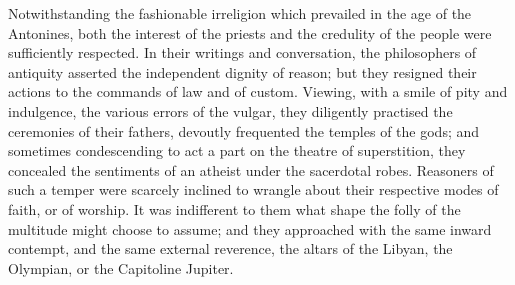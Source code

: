 
Notwithstanding the fashionable irreligion which prevailed in the
age of the Antonines, both the interest of the priests and the
credulity of the people were sufficiently respected. In their
writings and conversation, the philosophers of antiquity asserted
the independent dignity of reason; but they resigned their
actions to the commands of law and of custom. Viewing, with a
smile of pity and indulgence, the various errors of the vulgar,
they diligently practised the ceremonies of their fathers,
devoutly frequented the temples of the gods; and sometimes
condescending to act a part on the theatre of superstition, they
concealed the sentiments of an atheist under the sacerdotal
robes. Reasoners of such a temper were scarcely inclined to
wrangle about their respective modes of faith, or of worship. It
was indifferent to them what shape the folly of the multitude
might choose to assume; and they approached with the same inward
contempt, and the same external reverence, the altars of the
Libyan, the Olympian, or the Capitoline Jupiter.\footnotemark[8]



